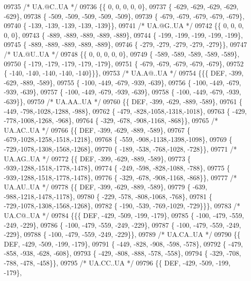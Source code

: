 \begin{DoxyCode}
09735 \textcolor{comment}{/* UA.@C..UA */}
09736 \{\{    0,    0,    0,    0,    0\},
09737 \{ -629, -629, -629, -629, -629\},
09738 \{ -509, -509, -509, -509, -509\},
09739 \{ -679, -679, -679, -679, -679\},
09740 \{ -139, -139, -139, -139, -139\}\},
09741 \textcolor{comment}{/* UA.@G..UA */}
09742 \{\{    0,    0,    0,    0,    0\},
09743 \{ -889, -889, -889, -889, -889\},
09744 \{ -199, -199, -199, -199, -199\},
09745 \{ -889, -889, -889, -889, -889\},
09746 \{ -279, -279, -279, -279, -279\}\},
09747 \textcolor{comment}{/* UA.@U..UA */}
09748 \{\{    0,    0,    0,    0,    0\},
09749 \{ -589, -589, -589, -589, -589\},
09750 \{ -179, -179, -179, -179, -179\},
09751 \{ -679, -679, -679, -679, -679\},
09752 \{ -140, -140, -140, -140, -140\}\}\},
09753 \textcolor{comment}{/* UA.A@..UA */}
09754 \{\{\{  DEF, -399, -629, -889, -589\},
09755 \{ -100, -449, -679, -939, -639\},
09756 \{ -100, -449, -679, -939, -639\},
09757 \{ -100, -449, -679, -939, -639\},
09758 \{ -100, -449, -679, -939, -639\}\},
09759 \textcolor{comment}{/* UA.AA..UA */}
09760 \{\{  DEF, -399, -629, -889, -589\},
09761 \{ -449, -798,-1028,-1288, -988\},
09762 \{ -479, -828,-1058,-1318,-1018\},
09763 \{ -429, -778,-1008,-1268, -968\},
09764 \{ -329, -678, -908,-1168, -868\}\},
09765 \textcolor{comment}{/* UA.AC..UA */}
09766 \{\{  DEF, -399, -629, -889, -589\},
09767 \{ -679,-1028,-1258,-1518,-1218\},
09768 \{ -559, -908,-1138,-1398,-1098\},
09769 \{ -729,-1078,-1308,-1568,-1268\},
09770 \{ -189, -538, -768,-1028, -728\}\},
09771 \textcolor{comment}{/* UA.AG..UA */}
09772 \{\{  DEF, -399, -629, -889, -589\},
09773 \{ -939,-1288,-1518,-1778,-1478\},
09774 \{ -249, -598, -828,-1088, -788\},
09775 \{ -939,-1288,-1518,-1778,-1478\},
09776 \{ -329, -678, -908,-1168, -868\}\},
09777 \textcolor{comment}{/* UA.AU..UA */}
09778 \{\{  DEF, -399, -629, -889, -589\},
09779 \{ -639, -988,-1218,-1478,-1178\},
09780 \{ -229, -578, -808,-1068, -768\},
09781 \{ -729,-1078,-1308,-1568,-1268\},
09782 \{ -190, -539, -769,-1029, -729\}\}\},
09783 \textcolor{comment}{/* UA.C@..UA */}
09784 \{\{\{  DEF, -429, -509, -199, -179\},
09785 \{ -100, -479, -559, -249, -229\},
09786 \{ -100, -479, -559, -249, -229\},
09787 \{ -100, -479, -559, -249, -229\},
09788 \{ -100, -479, -559, -249, -229\}\},
09789 \textcolor{comment}{/* UA.CA..UA */}
09790 \{\{  DEF, -429, -509, -199, -179\},
09791 \{ -449, -828, -908, -598, -578\},
09792 \{ -479, -858, -938, -628, -608\},
09793 \{ -429, -808, -888, -578, -558\},
09794 \{ -329, -708, -788, -478, -458\}\},
09795 \textcolor{comment}{/* UA.CC..UA */}
09796 \{\{  DEF, -429, -509, -199, -179\},

\end{DoxyCode}
